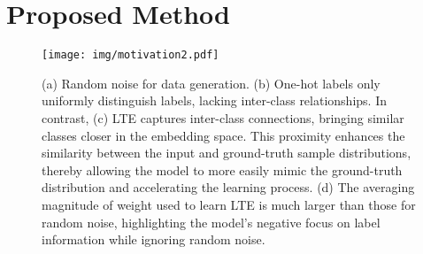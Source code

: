 \documentclass{article} %
\begin{document}
\section{Proposed Method}
\begin{figure}[t]
\begin{center}
\texttt{[image: img/motivation2.pdf]}
\end{center}
\caption{(a) Random noise for data generation. (b) One-hot labels only uniformly distinguish labels, lacking inter-class relationships. In contrast, (c) LTE captures inter-class connections, bringing similar classes closer in the embedding space. This proximity enhances the similarity between the input and ground-truth sample distributions, thereby allowing the model to more easily mimic the ground-truth distribution and accelerating the learning process. (d) The averaging magnitude of weight used to learn LTE is much larger than those for random noise, highlighting the model's negative focus on label information while ignoring random noise. }
\label{fig:motivation}
\end{figure}
\end{document}
